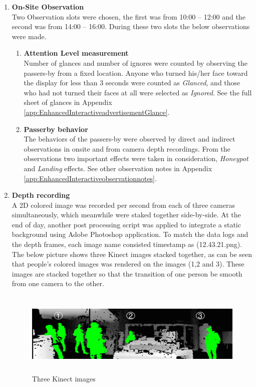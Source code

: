 \begin{enumerate}
\item \textbf{On-Site Observation} \\
Two Observation slots were chosen, the first was from 10:00 – 12:00 and the second was from 14:00 – 16:00. During these two slots the below observations were made.

\begin{enumerate}
\item \textbf{Attention Level measurement} \\
Number of glances and number of ignores were counted by observing the passers-by from a fixed location. Anyone who turned his/her face toward the display for less than 3 seconds were counted as \emph{Glanced}, and those who had not turned their faces at all were selected as \emph{Ignored}. See the full sheet of glances in Appendix \ref{app:EnhancedInteractiveadvertisementGlance}.

\item \textbf{Passerby behavior} \\
The behaviors of the passers-by were observed by direct and indirect observations in onsite and from camera depth recordings. From the observations two important effects were taken in consideration, \emph{Honeypot} and \emph{Landing} effects. See other observation notes in Appendix \ref{app:EnhancedInteractiveobservationnotes}.



\end{enumerate}

\item \textbf{Depth recording} \\
A 2D colored image was recorded per second from each of three cameras simultaneously, which meanwhile were staked together side-by-side. At the end of day, another post processing script was applied to integrate a static background using Adobe Photoshop application. To match the data logs and the depth frames, each image name consisted timestamp as (12.43.21.png).
The below picture shows three Kinect images stacked together, as can be seen that people's colored images was rendered on the images (1,2 and 3). These images are stacked together so that the transition of one person be smooth from one camera to the other.


\begin{minipage}{0.95\textwidth}
\begin{flushright}
\begin{figure}[H]
   \centering
    \includegraphics[width=\textwidth,height=40mm]{Figures/9/stacked_image}%
    \caption{Three Kinect images}%
    \label{fig:threekinectimages}%
\end{figure}
\end{flushright}
\end{minipage}



\end{enumerate}

